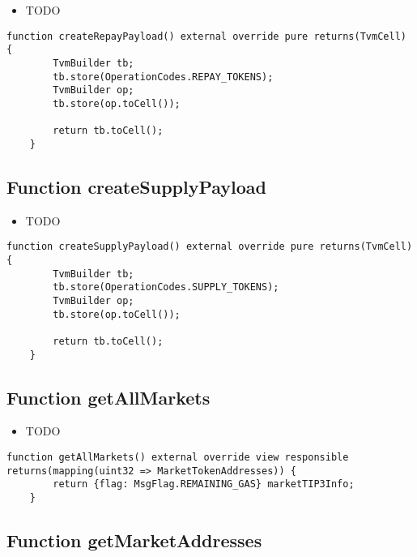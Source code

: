 \noindent\begin{itemize}
\item TODO
\end{itemize}

\begin{lstlisting}[firstnumber=336]
    function createRepayPayload() external override pure returns(TvmCell) {
        TvmBuilder tb;
        tb.store(OperationCodes.REPAY_TOKENS);
        TvmBuilder op;
        tb.store(op.toCell());

        return tb.toCell();
    }
\end{lstlisting}

\subsection{Function createSupplyPayload}

\noindent\begin{itemize}
\item TODO
\end{itemize}

\begin{lstlisting}[firstnumber=327]
    function createSupplyPayload() external override pure returns(TvmCell) {
        TvmBuilder tb;
        tb.store(OperationCodes.SUPPLY_TOKENS);
        TvmBuilder op;
        tb.store(op.toCell());

        return tb.toCell();
    }
\end{lstlisting}

\subsection{Function getAllMarkets}

\noindent\begin{itemize}
\item TODO
\end{itemize}

\begin{lstlisting}[firstnumber=288]
    function getAllMarkets() external override view responsible returns(mapping(uint32 => MarketTokenAddresses)) {
        return {flag: MsgFlag.REMAINING_GAS} marketTIP3Info;
    }
\end{lstlisting}

\subsection{Function getMarketAddresses}

